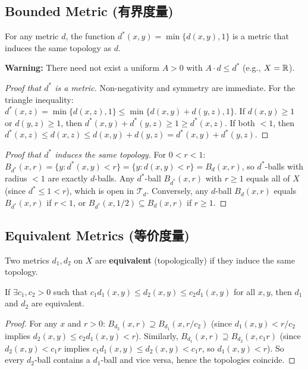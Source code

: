 \documentclass{article}
\begin{document}
\subsection{Bounded Metric (有界度量)}\label{def:bounded-metric}
\begin{proposition}
  For any metric $d$, the function $d^*(x, y) = \min\{d(x, y), 1\}$
  is a metric that induces the same topology as $d$.
\end{proposition}
\textbf{Warning:} There need not exist a uniform $A > 0$ with $A
\cdot d \le d^*$ (e.g., $X = \mathbb{R}$).

\begin{proof}[Proof that $d^*$ is a metric]
  Non-negativity and symmetry are immediate. For the triangle inequality:
  $d^*(x,z) = \min\{d(x,z),1\} \le \min\{d(x,y)+d(y,z), 1\}$.
  If $d(x,y) \ge 1$ or $d(y,z) \ge 1$, then $d^*(x,y)+d^*(y,z) \ge 1
  \ge d^*(x,z)$.
  If both $< 1$, then $d^*(x,z) \le d(x,z) \le d(x,y)+d(y,z) =
  d^*(x,y)+d^*(y,z)$.
\end{proof}

\begin{proof}[Proof that $d^*$ induces the same topology]
  For $0 < r < 1$: $B_{d^*}(x,r) = \{y : d^*(x,y) < r\} = \{y :
  d(x,y) < r\} = B_d(x,r)$,
  so $d^*$-balls with radius $< 1$ are exactly $d$-balls.
  Any $d^*$-ball $B_{d^*}(x,r)$ with $r \ge 1$ equals all of $X$
  (since $d^* \le 1 < r$),
  which is open in $\mathcal{T}_d$. Conversely, any $d$-ball
  $B_d(x,r)$ equals $B_{d^*}(x,r)$ if $r < 1$,
  or $B_{d^*}(x,1/2) \subseteq B_d(x,r)$ if $r \ge 1$.
\end{proof}

\subsection{Equivalent Metrics (等价度量)}\label{def:equiv-metrics}
Two metrics $d_1, d_2$ on $X$ are \textbf{equivalent} (topologically)
if they induce the same topology.
\begin{theorem}
  If $\exists c_1, c_2 > 0$ such that $c_1 d_1(x,y) \le d_2(x,y) \le
  c_2 d_1(x,y)$ for all $x, y$, then $d_1$ and $d_2$ are equivalent.
\end{theorem}
\begin{proof}
  For any $x$ and $r > 0$:
  $B_{d_2}(x, r) \supseteq B_{d_1}(x, r/c_2)$
  (since $d_1(x,y) < r/c_2$ implies $d_2(x,y) \le c_2 d_1(x,y) < r$).
  Similarly, $B_{d_1}(x, r) \supseteq B_{d_2}(x, c_1 r)$
  (since $d_2(x,y) < c_1 r$ implies $c_1 d_1(x,y) \le d_2(x,y) < c_1
  r$, so $d_1(x,y) < r$).
  So every $d_2$-ball contains a $d_1$-ball and vice versa, hence the
  topologies coincide.
\end{proof}
\end{document}
